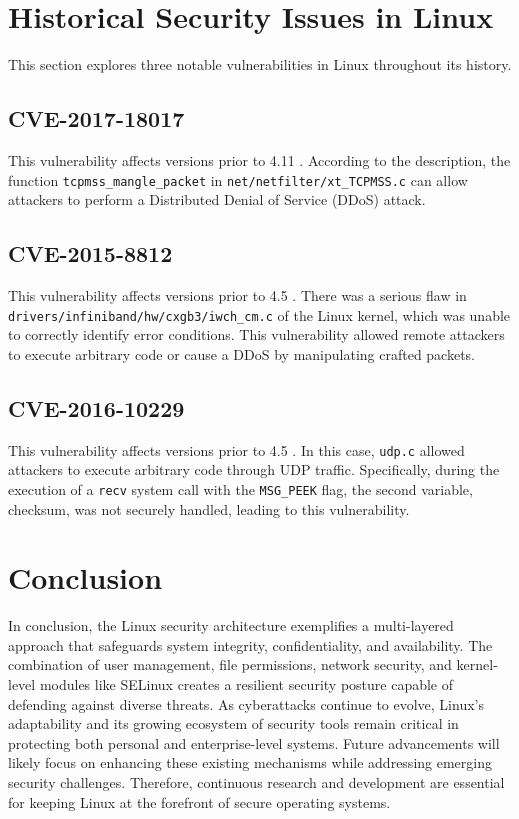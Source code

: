 \documentclass[conference]{IEEEtran}
\begin{document}
\section{Historical Security Issues in Linux}

This section explores three notable vulnerabilities in Linux throughout its history.

\subsection{CVE-2017-18017}

This vulnerability affects versions prior to 4.11 \cite{mend}. According to the description, the function \texttt{tcpmss\_mangle\_packet} in \texttt{net/netfilter/xt\_TCPMSS.c} can allow attackers to perform a Distributed Denial of Service (DDoS) attack.

\subsection{CVE-2015-8812}

This vulnerability affects versions prior to 4.5 \cite{mend}. There was a serious flaw in \texttt{drivers/infiniband/hw/cxgb3/iwch\_cm.c} of the Linux kernel, which was unable to correctly identify error conditions. This vulnerability allowed remote attackers to execute arbitrary code or cause a DDoS by manipulating crafted packets.

\subsection{CVE-2016-10229}

This vulnerability affects versions prior to 4.5 \cite{mend}. In this case, \texttt{udp.c} allowed attackers to execute arbitrary code through UDP traffic. Specifically, during the execution of a \texttt{recv} system call with the \texttt{MSG\_PEEK} flag, the second variable, checksum, was not securely handled, leading to this vulnerability.

\section{Conclusion}
In conclusion, the Linux security architecture exemplifies a multi-layered approach that safeguards system integrity, confidentiality, and availability. The combination of user management, file permissions, network security, and kernel-level modules like SELinux creates a resilient security posture capable of defending against diverse threats. As cyberattacks continue to evolve, Linux’s adaptability and its growing ecosystem of security tools remain critical in protecting both personal and enterprise-level systems. Future advancements will likely focus on enhancing these existing mechanisms while addressing emerging security challenges. Therefore, continuous research and development are essential for keeping Linux at the forefront of secure operating systems.
\end{document}
